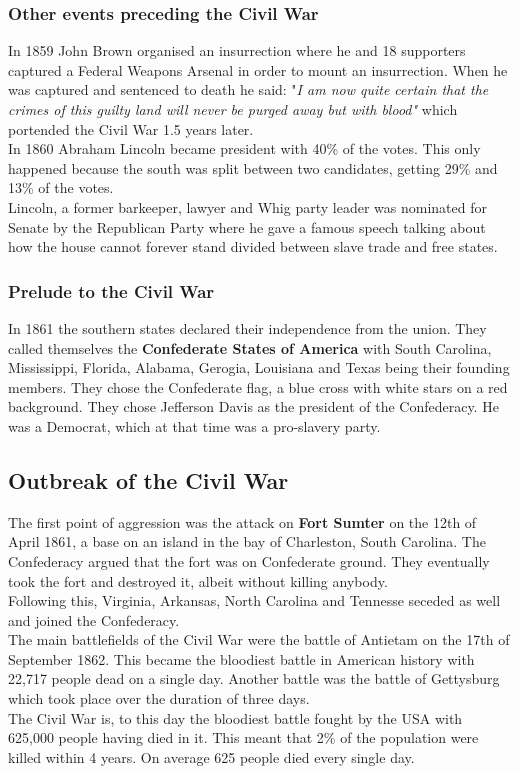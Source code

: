 \documentclass{article}
\begin{document}
	\subsubsection{Other events preceding the Civil War}
	In 1859 John Brown organised an insurrection where he and 18 supporters captured a Federal Weapons Arsenal in order to mount an insurrection. When he was captured and sentenced to death he said: "\textit{I am now quite certain that the crimes of this guilty land will never be purged away but with blood"} which portended the Civil War 1.5 years later. \\
	In 1860 Abraham Lincoln became president with 40\% of the votes. This only happened because the south was split between two candidates, getting 29\% and 13\% of the votes. \\
	Lincoln, a former barkeeper, lawyer and Whig party leader was nominated for Senate by the Republican Party where he gave a famous speech talking about how the house cannot forever stand divided between slave trade and free states. \\
	\subsubsection{Prelude to the Civil War}
	In 1861 the southern states declared their independence from the union. They called themselves the \textbf{Confederate States of America} with South Carolina, Mississippi, Florida, Alabama, Gerogia, Louisiana and Texas being their founding members. They chose the Confederate flag, a blue cross with white stars on a red background. They chose Jefferson Davis as the president of the Confederacy. He was a Democrat, which at that time was a pro-slavery party. \\
	\subsection{Outbreak of the Civil War}
	The first point of aggression was the attack on \textbf{Fort Sumter} on the 12th of April 1861, a base on an island in the bay of Charleston, South Carolina. The Confederacy argued that the fort was on Confederate ground. They eventually took the fort and destroyed it, albeit without killing anybody. \\
	Following this, Virginia, Arkansas, North Carolina and Tennesse seceded as well and joined the Confederacy. \\
	The main battlefields of the Civil War were the battle of Antietam on the 17th of September 1862. This became the bloodiest battle in American history with 22,717 people dead on a single day.
	Another battle was the battle of Gettysburg which took place over the duration of three days. \\
	The Civil War is, to this day the bloodiest battle fought by the USA with 625,000 people having died in it. This meant that 2\% of the population were killed within 4 years. On average 625 people died every single day.\\
\end{document}
